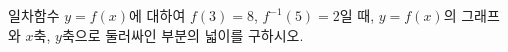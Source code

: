 \hspace*{2mm}\begin{minipage}[t]{\dimexpr\linewidth-2mm\relax}\vspace{0pt}
일차함수 $y=f(x)$에 대하여 $f(3)=8$, $f^{-1}(5)=2$일 때, $y=f(x)$의 그래프와 $x$축, $y$축으로 둘러싸인 부분의 넓이를 구하시오.\end{minipage}
